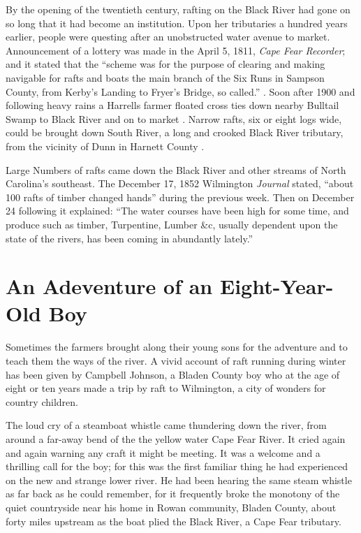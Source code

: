 \documentclass[11pt, a5paper, openright]{book}
\begin{document}
By the opening of the twentieth century, rafting on the Black River
had gone on so long that it had become an institution.  Upon her
tributaries a hundred years earlier, people were questing after an
unobstructed water avenue to market.  Announcement of a lottery was
made in the April 5, 1811, \textit{Cape Fear Recorder}; and it stated
that the ``scheme was for the purpose of clearing and making navigable
for rafts and boats the main branch of the Six Runs in Sampson County,
from Kerby's Landing to Fryer's Bridge, so called.''
\citep[4-5-11]{cfr}.  Soon after 1900 and following heavy rains a
Harrells farmer floated cross ties down nearby Bulltail Swamp to Black
River and on to market \citep[]{melvinew}.  Narrow rafts, six or eight
logs wide, could be brought down South River, a long and crooked Black
River tributary, from the vicinity of Dunn in Harnett County
\citep[]{johnsonlg}.\par

Large Numbers of rafts came down the Black River and other streams of
North Carolina's southeast.  The December 17, 1852 Wilmington
\textit{Journal} stated, ``about 100 rafts of timber changed hands''
during the previous week.  Then on December 24 following it explained:
``The water courses have been high for some time, and produce such as
timber, Turpentine, Lumber \&c, usually dependent upon the state of
the rivers, has been coming in abundantly lately.''\par

\section[An Adventure]{An Adeventure of an Eight-Year-Old Boy}

Sometimes the farmers brought along their young sons for the adventure
and to teach them the ways of the river.  A vivid account of raft
running during winter has been given by Campbell Johnson, a Bladen
County boy who at the age of eight or ten years made a trip by raft to
Wilmington, a city of wonders for country children.\par

The loud cry of a steamboat whistle came thundering down the river,
from around a far-away bend of the the yellow water Cape Fear River.
It cried again and again warning any craft it might be meeting.  It
was a welcome and a thrilling call for the boy; for this was the first
familiar thing he had experienced on the new and strange lower river.
He had been hearing the same steam whistle as far back as he could
remember, for it frequently broke the monotony of the quiet
countryside near his home in Rowan community, Bladen County, about
forty miles upstream as the boat plied the Black River, a Cape Fear
tributary.\par
\end{document}
